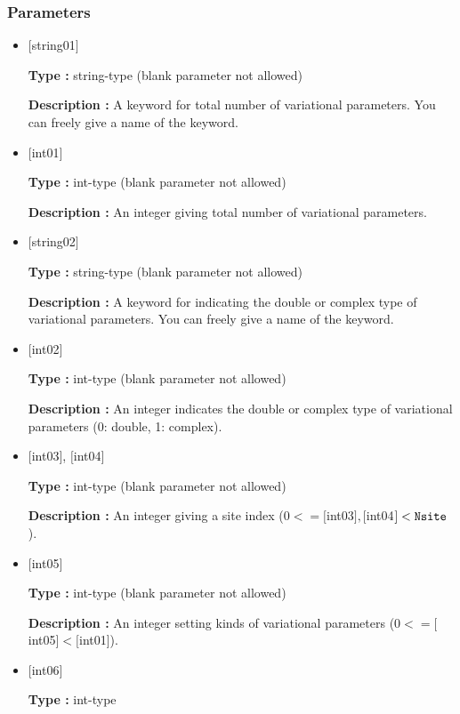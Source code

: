 \subsubsection{Parameters}
 \begin{itemize}

   \item  $[$string01$]$
   
    {\bf Type :} string-type (blank parameter not allowed)

   {\bf Description :}  A keyword for total number of variational parameters. You can freely give a name of the keyword. 

   \item  $[$int01$]$
   
    {\bf Type :} int-type (blank parameter not allowed)

   {\bf Description :} An integer giving total number of variational parameters. 

   \item  $[$string02$]$
   
    {\bf Type :} string-type (blank parameter not allowed)

   {\bf Description :} A keyword for indicating the double or complex type of variational parameters. You can freely give a name of the keyword.
   
   \item  $[$int02$]$
   
    {\bf Type :} int-type (blank parameter not allowed)

   {\bf Description :} An integer indicates the double or complex type of variational parameters (0: double, 1: complex). 

  \item  $[$int03$]$, $[$int04$]$
   
 {\bf Type :} int-type (blank parameter not allowed)

{\bf Description :} An integer giving a site index ($0<= [$int03$], [$int04$] <\verb|Nsite|$).
 
 \item  $[$int05$]$
   
   {\bf Type :} int-type (blank parameter not allowed)

  {\bf Description :} An integer setting kinds of variational  parameters ($0<= [$int05$]<[$int01]). 

 \item  $[$int06$]$
   
   {\bf Type :} int-type


\end{itemize}
